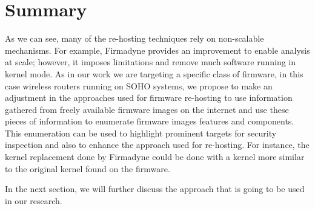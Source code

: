 \section{Summary}


As we can see, many of the re-hosting techniques rely on non-scalable mechanisms. For example, Firmadyne provides an improvement to enable analysis at scale; however, it imposes limitations and remove much software running in kernel mode. As in our work we are targeting a specific class of firmware, in this case wireless routers running on SOHO systems, we propose to make an adjustment in the approaches used for firmware re-hosting to use information gathered from freely available firmware images on the internet and use these pieces of information to enumerate firmware images features and components. This enumeration can be used to highlight prominent targets for security inspection and also to enhance the approach used for re-hosting. For instance, the kernel replacement done by Firmadyne could be done with a kernel more similar to the original kernel found on the firmware. 

In the next section, we will further discuss the approach that is going to be used in our research.